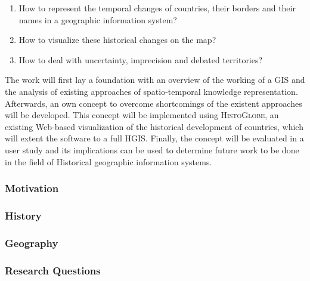 \begin{enumerate}
  \item How to represent the temporal changes of countries, their borders and their names in a geographic information system?
  \item How to visualize these historical changes on the map?
  \item How to deal with uncertainty, imprecision and debated territories?
\end{enumerate}

The work will first lay a foundation with an overview of the working of a GIS and the analysis of existing approaches of spatio-temporal knowledge representation. Afterwards, an own concept to overcome shortcomings of the existent approaches will be developed. This concept will be implemented using \textsc{HistoGlobe}, an existing Web-based visualization of the historical development of countries, which will extent the software to a full HGIS. Finally, the concept will be evaluated in a user study and its implications can be used to determine future work to be done in the field of Historical geographic information systems.

\subsubsection{Motivation} %
\label{ssub:motivation}



\subsubsection{History} %
\label{ssub:history}



\subsubsection{Geography} %
\label{ssub:geography}



\subsubsection{Research Questions} %
\label{ssub:research_questions}



